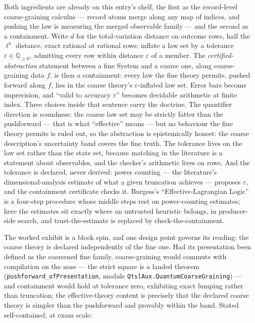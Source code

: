 Both ingredients are already on this entry's shelf, the first as the
record-level coarse-graining calculus --- record atoms merge along
any map of indices, and pushing the law is measuring the merged
observable family --- and the second as a containment. Write $d$ for
the total-variation distance on outcome rows, half the $\ell^1$
distance, exact rational at rational rows; inflate a law set by a
tolerance $\varepsilon \in \mathbb{Q}_{\geq 0}$, admitting every row
within distance $\varepsilon$ of a member. The
\emph{certified-abstraction} statement between a fine System and a
coarse one, along coarse-graining data $f$, is then a containment:
every law the fine theory permits, pushed forward along $f$, lies in
the coarse theory's $\varepsilon$-inflated law set. Error bars
become imprecision, and ``valid to accuracy $\varepsilon$'' becomes
decidable arithmetic at finite index. Three choices inside that
sentence carry the doctrine. The quantifier direction is soundness:
the coarse law set may be strictly fatter than the pushforward ---
that is what ``effective'' means --- but no behaviour the fine theory
permits is ruled out, so the abstraction is epistemically honest:
the coarse description's uncertainty band covers the fine truth.
The tolerance lives on the law set rather than the state set,
because matching in the literature is a statement about observables,
and the checker's arithmetic lives on rows. And the tolerance is
declared, never derived: power counting --- the literature's
dimensional-analysis estimate of what a given truncation achieves
\cite{burgess07} --- proposes $\varepsilon$, and the containment
certificate checks it. Burgess's ``Effective-Lagrangian Logic''
\cite{burgess07} is a four-step procedure whose middle steps rest on
power-counting estimates; here the estimates sit exactly where an
untrusted heuristic belongs, in producer-side search, and
trust-the-estimate is replaced by check-the-containment.

The worked exhibit is a block spin, and one design point governs its
reading: the coarse theory is declared independently of the fine
one. Had its presentation been defined as the coarsened fine family,
coarse-graining would commute with compilation on the nose --- the
strict square is a landed theorem
(\texttt{pushforward\_ofPresentation}, module
\texttt{QtslAux.QuantumCoarseGraining}) --- and containment would
hold at tolerance zero, exhibiting exact lumping rather than
truncation; the effective-theory content is precisely that the
declared coarse theory is simpler than the pushforward and provably
within the band. Stated self-contained, at exam scale:

